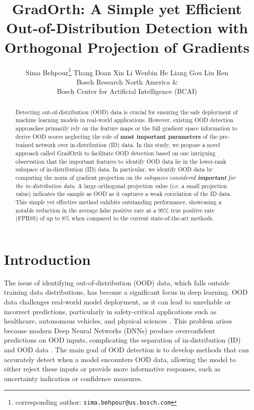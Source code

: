 \documentclass{article}
\title{GradOrth: A Simple yet Efficient Out-of-Distribution Detection with Orthogonal Projection of Gradients}
\author{%
Sima Behpour\thanks{corresponding author: \texttt{sima.behpour@us.bosch.com}} \hspace{5mm} Thang Doan \hspace{5mm} Xin Li \hspace{5mm} Wenbin He \hspace{5mm} Liang Gou \hspace{5mm} Liu Ren  \\
  Bosch Research North America $\&$ \\ Bosch Center for Artificial Intelligence (BCAI)\\
}
\begin{document}
\maketitle


\begin{abstract}
Detecting out-of-distribution (OOD) data is crucial for ensuring the safe deployment of machine learning models in real-world applications. However, existing OOD detection approaches primarily rely on the feature maps or the full gradient space information to derive OOD scores neglecting the role of \textbf{most important parameters} of the pre-trained network over in-distribution (ID) data. In this study, we propose a novel approach called GradOrth to facilitate OOD detection based on one intriguing observation that the important features to identify OOD data lie in the lower-rank subspace of in-distribution (ID) data.
In particular, we identify OOD data by computing the norm of gradient projection on \textit{the subspaces considered \textbf{important} for the in-distribution data}. A large orthogonal projection value (i.e. a small projection value) indicates the sample as OOD as it captures a weak correlation of the ID data. This simple yet effective method exhibits outstanding performance, showcasing a notable reduction in the average false positive rate at a 95\% true positive rate (FPR95) of up to 8\% when compared to the current state-of-the-art methods.


\end{abstract}
\section{Introduction}\vspace{-0.3cm}
The issue of identifying out-of-distribution (OOD) data, which falls outside training data distributions, has become a significant focus in deep learning. OOD data challenges real-world model deployment, as it can lead to unreliable or incorrect predictions, particularly in safety-critical applications such as healthcare, autonomous vehicles, and physical sciences \cite{filos2020can, wang2017chestx,zhou2020mortality, agarwal2021learning, char2021model, boyer2021machine}. This problem arises because modern Deep Neural Networks (DNNs) produce overconfident predictions on OOD inputs, complicating the separation of in-distribution (ID) and OOD data \cite{zhou2017places,nguyen2015deep}. The main goal of OOD detection is to develop methods that can accurately detect when a model encounters OOD data, allowing the model to either reject these inputs or provide more informative responses, such as uncertainty indication or confidence measures.
\end{document}
